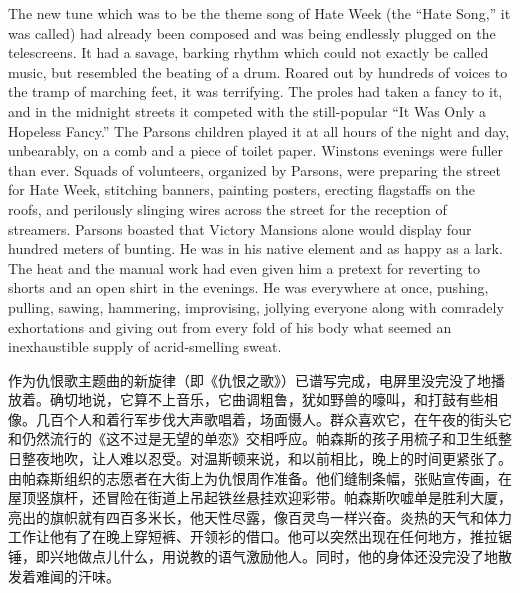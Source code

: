 \begin{paracol}{2}
\switchcolumn*

The new tune which was to be the theme song of Hate Week (the ``Hate
Song,'' it was called) had already been composed and was being endlessly
plugged on the telescreens. It had a savage, barking rhythm which could
not exactly be called music, but resembled the beating of a drum. Roared
out by hundreds of voices to the tramp of marching feet, it was
terrifying. The proles had taken a fancy to it, and in the midnight
streets it competed with the still-popular ``It Was Only a Hopeless
Fancy.'' The Parsons children played it at all hours of the night and
day, unbearably, on a comb and a piece of toilet paper.
Winston\textquotesingle s evenings were fuller than ever. Squads of
volunteers, organized by Parsons, were preparing the street for Hate
Week, stitching banners, painting posters, erecting flagstaffs on the
roofs, and perilously slinging wires across the street for the reception
of streamers. Parsons boasted that Victory Mansions alone would display
four hundred meters of bunting. He was in his native element and as
happy as a lark. The heat and the manual work had even given him a
pretext for reverting to shorts and an open shirt in the evenings. He
was everywhere at once, pushing, pulling, sawing, hammering,
improvising, jollying everyone along with comradely exhortations and
giving out from every fold of his body what seemed an inexhaustible
supply of acrid-smelling sweat.

\switchcolumn

作为仇恨歌主题曲的新旋律（即《仇恨之歌》）已谱写完成，电屏里没完没了地播放着。确切地说，它算不上音乐，它曲调粗鲁，犹如野兽的嚎叫，和打鼓有些相像。几百个人和着行军步伐大声歌唱着，场面慑人。群众喜欢它，在午夜的街头它和仍然流行的《这不过是无望的单恋》交相呼应。帕森斯的孩子用梳子和卫生纸整日整夜地吹，让人难以忍受。对温斯顿来说，和以前相比，晚上的时间更紧张了。由帕森斯组织的志愿者在大街上为仇恨周作准备。他们缝制条幅，张贴宣传画，在屋顶竖旗杆，还冒险在街道上吊起铁丝悬挂欢迎彩带。帕森斯吹嘘单是胜利大厦，亮出的旗帜就有四百多米长，他天性尽露，像百灵鸟一样兴奋。炎热的天气和体力工作让他有了在晚上穿短裤、开领衫的借口。他可以突然出现在任何地方，推拉锯锤，即兴地做点儿什么，用说教的语气激励他人。同时，他的身体还没完没了地散发着难闻的汗味。

\switchcolumn*


\end{paracol}
